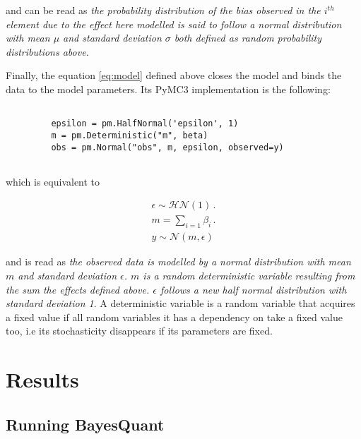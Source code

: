 and can be read as \textit{the probability distribution of the bias observed in the $i^{th}$ element due to the effect here modelled is said to follow a normal distribution with mean $\mu$ and standard deviation $\sigma$ both defined as random probability distributions above.}

Finally, the equation \ref{eq:model} defined above closes the model and binds the data to the model parameters. Its PyMC3 implementation is the following:

\begin{verbatim}
               
         epsilon = pm.HalfNormal('epsilon', 1)                
         m = pm.Deterministic("m", beta)
         obs = pm.Normal("obs", m, epsilon, observed=y)
      
\end{verbatim}

which is equivalent to

\begin{align}
\nonumber \epsilon \sim \mathcal{HN}(1) \,. \\ 
m = \sum_{i=1} \beta_i \,. \\ 
\nonumber y \sim \mathcal{N}(m, \epsilon)
\end{align}

and is read as \textit{the observed data is modelled by a normal distribution with mean $m$ and standard deviation $\epsilon$. $m$ is a random deterministic variable resulting from the sum the effects defined above. $\epsilon$ follows a new half normal distribution with standard deviation 1}. A deterministic variable is a random variable that acquires a fixed value if all random variables it has a dependency on take a fixed value too, i.e its stochasticity disappears if its parameters are fixed.




\section{Results}

\begin{figure}[!h]
 \centering 
 
\end{figure}


\subsection{Running BayesQuant}

